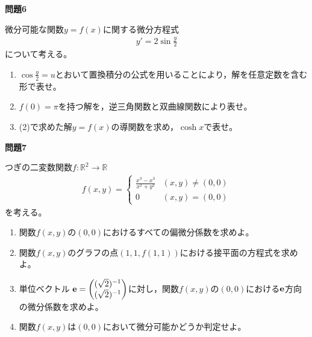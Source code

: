 \documentclass[a4paper,12pt,dvipdfmx,fleqn, oneside]{jsarticle}
\theoremstyle{defstyle}
\theoremstyle{thmx}
\theoremstyle{qesstyle}
\begin{document}
\begin{shadebox}
    \textbf{問題6}

    微分可能な関数$y=f(x)$に関する微分方程式
    \begin{align*}
        y'=2 \sin \frac{y}{2}
    \end{align*}
    について考える。
    \begin{enumerate}
        \item $\cos \frac{y}{2}=u$とおいて置換積分の公式を用いることにより，解を任意定数を含む形で表せ。
        \item $f(0)= \pi $を持つ解を，逆三角関数と双曲線関数により表せ。
        \item (2)で求めた解$y=f(x)$の導関数を求め，$\cosh x$で表せ。
    \end{enumerate}
\end{shadebox}
\begin{shadebox}
    \textbf{問題7}

    つぎの二変数関数$f: \mathbb{R}^2 \rightarrow \mathbb{R}$
    \begin{align*}
        f(x,y) =
        \begin{cases}
            \frac{x^3-x^3}{x^2+y^2} & (x,y) \neq (0,0) \\
            0                       & (x,y)= (0,0)
        \end{cases}
    \end{align*}
    を考える。
    \begin{enumerate}
        \item 関数$f(x,y)$の$(0,0)$におけるすべての偏微分係数を求めよ。
        \item 関数$f(x,y)$のグラフの点$(1,1,f(1,1))$における接平面の方程式を求めよ。
        \item 単位ベクトル $\bf{e}=
                  \begin{pmatrix}
                      (\sqrt{2})^{-1} \\
                      (\sqrt{2})^{-1}
                  \end{pmatrix}$に対し，関数$f(x,y)$の$(0,0)$における$\bf{e}$方向の微分係数を求めよ。
        \item 関数$f(x,y)$は$(0,0)$において微分可能かどうか判定せよ。
    \end{enumerate}
\end{shadebox}
\end{document}

